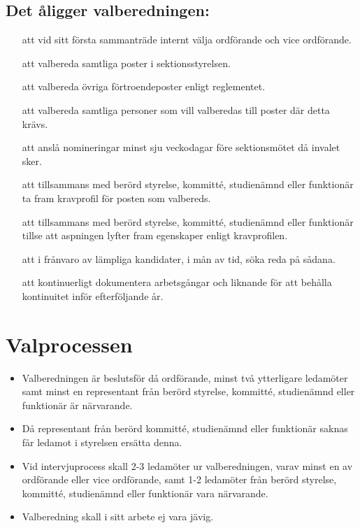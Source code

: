 \documentclass[a4paper]{article}
\begin{document}
\begin{foreningenv}{\forening{}}
    \subsection{Det åligger valberedningen:}
    \begin{itemize}
        \item[att] vid sitt första sammanträde internt välja ordförande och vice ordförande.
        \item[att] valbereda samtliga poster i sektionsstyrelsen.
        \item[att] valbereda övriga förtroendeposter enligt reglementet.
        \item[att] valbereda samtliga personer som vill valberedas till poster där detta krävs.
        \item[att] anslå nomineringar minst sju veckodagar före sektionsmötet då invalet sker.
        \item[att] tillsammans med berörd styrelse, kommitté, studienämnd eller funktionär ta fram kravprofil för posten som valbereds. 
        \item[att] tillsammans med berörd styrelse, kommitté, studienämnd eller funktionär tillse att aspningen lyfter fram  egenskaper enligt kravprofilen.
        \item[att] i frånvaro av lämpliga kandidater, i mån av tid, söka reda på sådana.
        \item[att] kontinuerligt dokumentera arbetsgångar och liknande för att behålla kontinuitet inför efterföljande år.
    \end{itemize}
    
    \section{Valprocessen}
    \begin{itemize}
        \item Valberedningen är beslutsför då ordförande, minst två ytterligare ledamöter samt minst en representant från berörd styrelse, kommitté, studienämnd eller funktionär är närvarande.
        \item Då representant från berörd kommitté, studienämnd eller funktionär saknas får ledamot i styrelsen ersätta denna.
        \item Vid intervjuprocess skall 2-3 ledamöter ur valberedningen, varav minst en av ordförande eller vice ordförande, samt 1-2 ledamöter från berörd styrelse, kommitté, studienämnd eller funktionär vara närvarande.
        \item Valberedning skall i sitt arbete ej vara jävig.
    \end{itemize}
    

\end{foreningenv}
\end{document}
